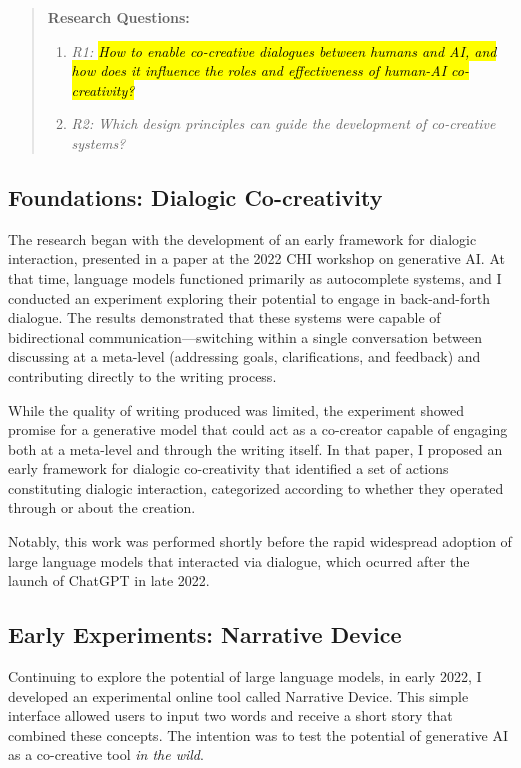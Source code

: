 \begin{quote}
\textbf{Research Questions:}

\begin{enumerate}
    \item \textit{R1: \hl{How to enable co-creative dialogues between humans and AI, and how does it influence the roles and effectiveness of human-AI co-creativity?}}
    \item \textit{R2: Which design principles can guide the development of co-creative systems?}
\end{enumerate}

\end{quote}

\subsection{Foundations: Dialogic Co-creativity}

The research began with the development of an early framework for dialogic interaction, presented in a paper at the 2022 CHI workshop on generative AI. At that time, language models functioned primarily as autocomplete systems, and I conducted an experiment exploring their potential to engage in back-and-forth dialogue. The results demonstrated that these systems were capable of bidirectional communication—switching within a single conversation between discussing at a meta-level (addressing goals, clarifications, and feedback) and contributing directly to the writing process.

While the quality of writing produced was limited, the experiment showed promise for a generative model that could act as a co-creator capable of engaging both at a meta-level and through the writing itself. In that paper, I proposed an early framework for dialogic co-creativity that identified a set of actions constituting dialogic interaction, categorized according to whether they operated through or about the creation.

Notably, this work was performed shortly before the rapid widespread adoption of large language models that interacted via dialogue,  which ocurred after the launch of ChatGPT in late 2022.

\subsection{Early Experiments: Narrative Device}

Continuing to explore the potential of large language models, in early 2022, I developed an experimental online tool called Narrative Device. This simple interface allowed users to input two words and receive a short story that combined these concepts. The intention was to test the potential of generative AI as a co-creative tool \textit{in the wild}.

